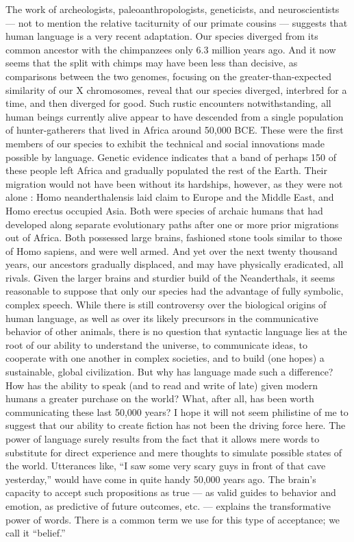\documentclass[a4paper,14pt]{extarticle}
\begin{document}
The work of archeologists, paleoanthropologists, geneticists, and neuroscientists --- not to mention the relative taciturnity of our primate cousins --- suggests that human language is a very recent adaptation.
Our species diverged from its common ancestor with the chimpanzees only 6.3 million years ago.
And it now seems that the split with chimps may have been less than decisive, as comparisons between the two genomes, focusing on the greater-than-expected similarity of our X chromosomes, reveal that our species diverged, interbred for a time, and then diverged for good.
Such rustic encounters notwithstanding, all human beings currently alive appear to have descended from a single population of hunter-gatherers that lived in Africa around 50,000 BCE.
These were the first members of our species to exhibit the technical and social innovations made possible by language.
Genetic evidence indicates that a band of perhaps 150 of these people left Africa and gradually populated the rest of the Earth.
Their migration would not have been without its hardships, however, as they were not alone :
Homo neanderthalensis laid claim to Europe and the Middle East, and Homo erectus occupied Asia.
Both were species of archaic humans that had developed along separate evolutionary paths after one or more prior migrations out of Africa.
Both possessed large brains, fashioned stone tools similar to those of Homo sapiens, and were well armed.
And yet over the next twenty thousand years, our ancestors gradually displaced, and may have physically eradicated, all rivals.
Given the larger brains and sturdier build of the Neanderthals, it seems reasonable to suppose that only our species had the advantage of fully symbolic, complex speech.
While there is still controversy over the biological origins of human language, as well as over its likely precursors in the communicative behavior of other animals, there is no question that syntactic language lies at the root of our ability to understand the universe, to communicate ideas, to cooperate with one another in complex societies, and to build (one hopes) a sustainable, global civilization.
But why has language made such a difference?
How has the ability to speak (and to read and write of late) given modern humans a greater purchase on the world?
What, after all, has been worth communicating these last 50,000 years?
I hope it will not seem philistine of me to suggest that our ability to create fiction has not been the driving force here.
The power of language surely results from the fact that it allows mere words to substitute for direct experience and mere thoughts to simulate possible states of the world.
Utterances like, “I saw some very scary guys in front of that cave yesterday,” would have come in quite handy 50,000 years ago.
The brain’s capacity to accept such propositions as true --- as valid guides to behavior and emotion, as predictive of future outcomes, etc. --- explains the transformative power of words.
There is a common term we use for this type of acceptance; we call it ``belief.''
\end{document}
